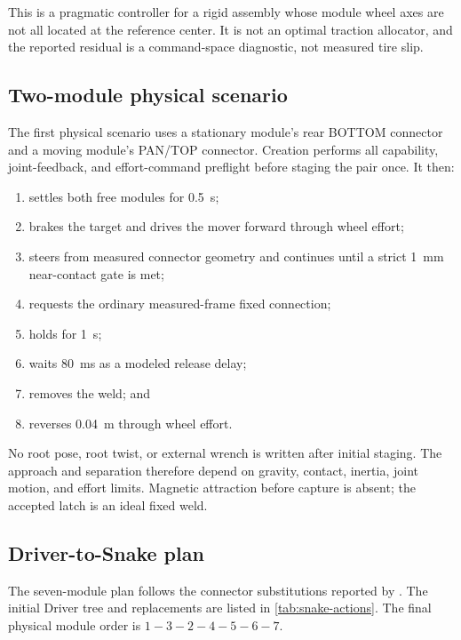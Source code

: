 This is a pragmatic controller for a rigid assembly whose module wheel axes are not
all located at the reference center. It is not an optimal traction allocator, and the
reported residual is a command-space diagnostic, not measured tire slip.

\subsection{Two-module physical scenario}

The first physical scenario uses a stationary module's rear BOTTOM connector and a
moving module's PAN/TOP connector. Creation performs all capability, joint-feedback,
and effort-command preflight before staging the pair once. It then:

\begin{enumerate}
  \item settles both free modules for \SI{0.5}{s};
  \item brakes the target and drives the mover forward through wheel effort;
  \item steers from measured connector geometry and continues until a strict
        \SI{1}{mm} near-contact gate is met;
  \item requests the ordinary measured-frame fixed connection;
  \item holds for \SI{1}{s};
  \item waits \SI{80}{ms}\sourcefact{} as a modeled release delay;
  \item removes the weld; and
  \item reverses \SI{0.04}{m} through wheel effort.
\end{enumerate}

No root pose, root twist, or external wrench is written after initial staging. The
approach and separation therefore depend on gravity, contact, inertia, joint motion,
and effort limits. Magnetic attraction before capture is absent; the accepted latch is
an ideal fixed weld.

\subsection{Driver-to-Snake plan}

The seven-module plan follows the connector substitutions reported by
\citet{liu2019distributed}. The initial Driver tree and replacements are listed in
\cref{tab:snake-actions}. The final physical module order is
$1-3-2-4-5-6-7$.

